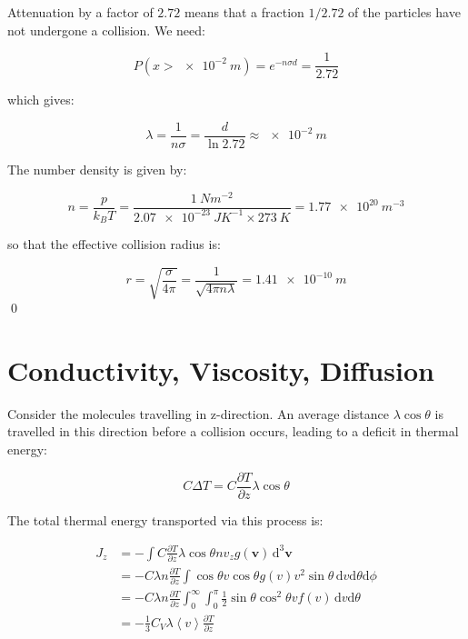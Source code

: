 \documentclass[12pt]{article}
\begin{document}
Attenuation by a factor of $2.72$ means that a fraction $1/2.72$ of the particles have not undergone a collision. We need:

\begin{equation}
    P(x > \qty{e-2}{m}) = e^{-n\sigma d} = \frac{1}{2.72}
\end{equation}

which gives:

\begin{equation}
    \lambda = \frac{1}{n\sigma} = \frac{d}{\ln{2.72}} \approx \qty{e-2}{m}
\end{equation}

The number density is given by:

\begin{equation}
    n = \frac{p}{k_{B}T} = \frac{\qty{1}{Nm^{-2}}}{\qty{2.07e-23}{JK^{-1}} \times \qty{273}{K}} = \qty{1.77e20}{m^{-3}}
\end{equation}

so that the effective collision radius is:

\begin{equation}
    r = \sqrt{\frac{\sigma}{4\pi}} = \frac{1}{\sqrt{4\pi n\lambda}} = \qty{1.41e-10}{m}
\end{equation}
\qed


\pagebreak
\section*{Conductivity, Viscosity, Diffusion}


Consider the molecules travelling in z-direction. An average distance $\lambda\cos{\theta}$ is travelled in this direction before a collision occurs, leading to a deficit in thermal energy:

\begin{equation}
    C \Delta T = C \frac{\partial T}{\partial z} \lambda \cos{\theta}
\end{equation}

The total thermal energy transported via this process is:

\begin{equation}
\begin{split}
    J_{z} &= -\int C \frac{\partial T}{\partial z} \lambda \cos{\theta} n v_{z} g(\mathbf{v}) \, \mathrm{d}^{3} \mathbf{v} \\
    &= -C \lambda n \frac{\partial T}{\partial z} \int \cos{\theta} v \cos{\theta} g(v) v^{2} \sin{\theta} \, \mathrm{d}v \mathrm{d}\theta \mathrm{d}\phi \\
    &= -C \lambda n \frac{\partial T}{\partial z} \int_{0}^{\infty} \int_{0}^{\pi} \frac{1}{2} \sin{\theta} \cos^{2}{\theta} v f(v) \, \mathrm{d}v \mathrm{d}\theta \\
    &= -\frac{1}{3} C_{V} \lambda \left\langle v \right\rangle \frac{\partial T}{\partial z} 
\end{split}
\end{equation}
\end{document}
